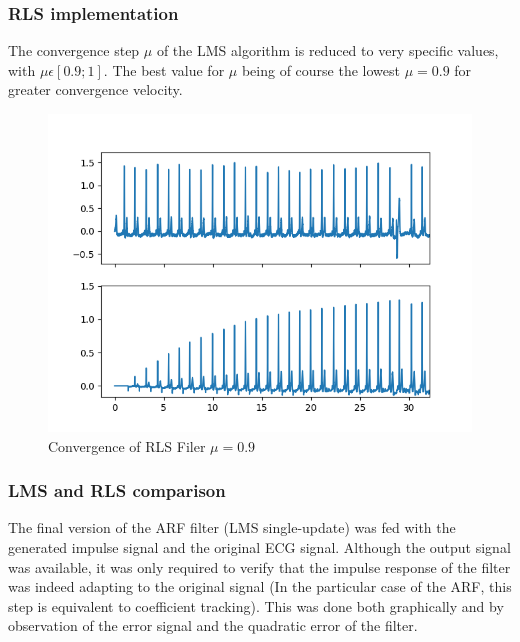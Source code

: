 \documentclass[conference]{IEEEtran}
\begin{document}
\subsubsection{RLS implementation}
The convergence step $\mu$ of the LMS algorithm is reduced to very specific values, with $\mu \epsilon [0.9; 1]$. The best value for $\mu$ being of course the lowest $\mu = 0.9$ for greater convergence velocity. 
\begin{figure}[H]
\centerline{\includegraphics[scale=0.6]{imagenes/RLS_filter.png}}
\caption{Convergence of RLS Filer $\mu=0.9$}
\label{fig}
\end{figure}

\subsubsection{LMS and RLS comparison} 

The final version of the ARF filter (LMS single-update) was fed with the generated impulse signal and the original ECG signal. Although the output signal was available, it was only required to verify that the impulse response of the filter was indeed adapting to the original signal (In the particular case of the ARF, this step is equivalent to coefficient tracking). This was done both graphically and by observation of the error signal and the quadratic error of the filter.\par
\end{document}
